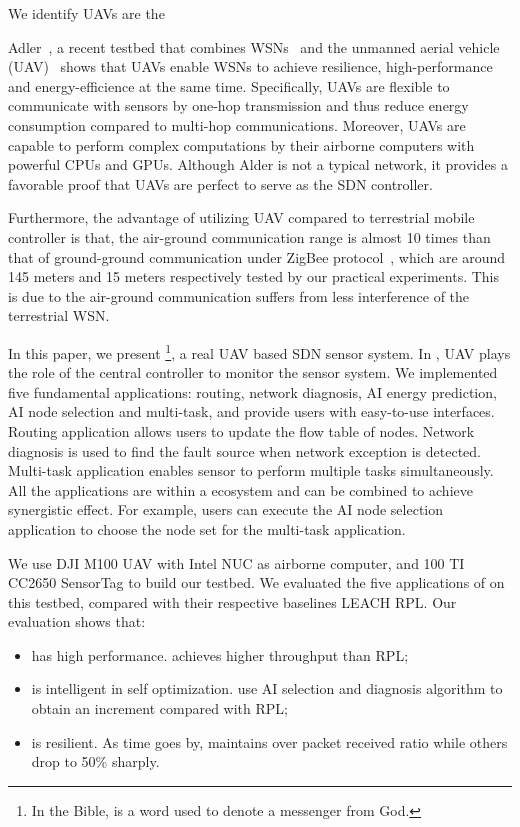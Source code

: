 We identify UAVs are the 

Adler~\cite{}, a recent testbed that combines WSNs~\cite{} 
and the unmanned aerial vehicle (UAV)~\cite{Cambone2005Unmanned, Perry2000Unmanned, Cathcart2014Method}
shows that UAVs enable WSNs to achieve resilience, 
high-performance and energy-efficience at the same time.
Specifically, UAVs are flexible to 
communicate with sensors by one-hop transmission
and thus reduce energy consumption compared to multi-hop communications.
Moreover, UAVs are capable to perform complex computations 
by their airborne computers with powerful CPUs and GPUs.
Although Alder is not a typical network, it provides a favorable proof
that UAVs are perfect to serve as the SDN controller.

Furthermore, the advantage of utilizing UAV compared to
terrestrial mobile controller is that, the air-ground communication range
is almost 10 times than that of ground-ground communication under ZigBee protocol~\cite{}, which are
around 145 meters and 15 meters respectively tested by our practical experiments.
This is due to the air-ground communication suffers from less interference of the terrestrial WSN.

In this paper, we present {\sdn}\footnote{In the Bible, {\sdn} is a word used to denote a messenger from God. }, 
a real UAV based SDN sensor system.
In {\sdn}, UAV plays the role of the central controller to monitor the sensor system.
We implemented five fundamental applications: routing, network diagnosis, 
AI energy prediction, AI node selection and multi-task,
and provide users with easy-to-use interfaces.
Routing application allows users to update the flow table of nodes.
Network diagnosis is used to find the fault source when network exception is detected.
Multi-task application enables sensor to perform multiple 
tasks simultaneously. All the applications are within a ecosystem
and can be combined to achieve synergistic effect. For example,
users can execute the AI node selection application to choose
the node set for the multi-task application. 


We use DJI M100 UAV with Intel NUC as airborne computer, 
and 100 TI CC2650 SensorTag to build our testbed.
We evaluated the five applications of  {\sdn} on this testbed, 
compared with their respective baselines LEACH RPL.
Our evaluation shows that:
\begin{itemize}
	\item[1)] {\sdn} has high performance. {\sdn} achieves {\simpleTput} higher
		throughput than RPL;
	\item[2)] {\sdn} is intelligent in self optimization. {\sdn} use AI
		selection and diagnosis algorithm to obtain an {\totalLife} increment
		compared with RPL;
	\item[3)] {\sdn} is resilient. As time goes by, {\sdn} maintains over
		{\pktRecvRatio} packet received ratio while others drop to 50\%
		sharply.
\end{itemize}

